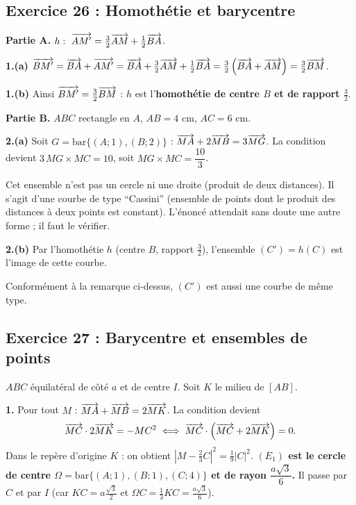 \subsection{Exercice 26 : Homoth\'etie et barycentre}

\textbf{Partie A.} $h:\ \vect{AM'}=\tfrac32\vect{AM}+\tfrac12\vect{BA}$.

\textbf{1.(a)} $\overrightarrow{BM'}=\overrightarrow{BA}+\overrightarrow{AM'}=\overrightarrow{BA}+\tfrac32\overrightarrow{AM}+\tfrac12\overrightarrow{BA}
=\tfrac32\left(\overrightarrow{BA}+\overrightarrow{AM}\right)=\tfrac32\overrightarrow{BM}$.

\textbf{1.(b)} Ainsi $\overrightarrow{BM'}=\tfrac32\overrightarrow{BM}$ : $h$ est l'\textbf{homoth\'etie de centre $B$ et de rapport $\frac32$}.

\textbf{Partie B.} $ABC$ rectangle en $A$, $AB=4$ cm, $AC=6$ cm.

\textbf{2.(a)} Soit $G=\mathrm{bar}\{(A;1),(B;2)\}$ : $\overrightarrow{MA}+2\overrightarrow{MB}=3\overrightarrow{MG}$. La condition devient
$3\,MG\times MC=10$, soit $MG\times MC=\dfrac{10}{3}$.
\begin{rem} Cet ensemble n'est pas un cercle ni une droite (produit de deux distances). Il s'agit d'une courbe
de type ``Cassini'' (ensemble de points dont le produit des distances \`a deux points est constant).
L'\'enonc\'e attendait sans doute une autre forme ; il faut le v\'erifier.\end{rem}

\textbf{2.(b)} Par l'homoth\'etie $h$ (centre $B$, rapport $\frac32$), l'ensemble $(C')=h(C)$ est l'image de cette courbe.
\begin{rem} Conform\'ement \`a la remarque ci-dessus, $(C')$ est aussi une courbe de m\^eme type.\end{rem}

\subsection{Exercice 27 : Barycentre et ensembles de points}

$ABC$ \'equilat\'eral de c\^ot\'e $a$ et de centre $I$. Soit $K$ le milieu de $[AB]$.

\textbf{1.} Pour tout $M$ : $\overrightarrow{MA}+\overrightarrow{MB}=2\overrightarrow{MK}$. La condition devient
\[
\overrightarrow{MC}\cdot2\overrightarrow{MK}=-MC^2\iff\overrightarrow{MC}\cdot\left(\overrightarrow{MC}+2\overrightarrow{MK}\right)=0.
\]
Dans le rep\`ere d'origine $K$ : on obtient $|M-\tfrac23C|^2=\tfrac19|C|^2$.
\textbf{$(E_1)$ est le cercle de centre $\Omega=\mathrm{bar}\{(A;1),(B;1),(C;4)\}$ et de rayon $\dfrac{a\sqrt3}{6}$.}
Il passe par $C$ et par $I$ (car $KC=a\frac{\sqrt3}{2}$ et $\Omega C=\frac13KC=\frac{a\sqrt3}{6}$).

